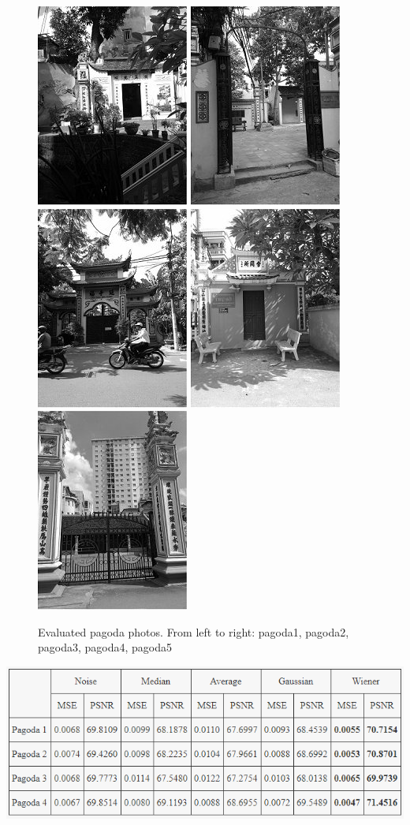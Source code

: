 \begin{figure}[h]
	\centering
	\includegraphics[width=0.18\columnwidth]{images/pagoda1.jpg}
	\includegraphics[width=0.18\columnwidth]{images/pagoda2.jpg}
	\includegraphics[width=0.18\columnwidth]{images/pagoda3.jpg}
	\includegraphics[width=0.18\columnwidth]{images/pagoda4.jpg}
	\includegraphics[width=0.18\columnwidth]{images/pagoda5.jpg}
	\caption{Evaluated pagoda photos. From left to right: pagoda1, pagoda2, pagoda3, pagoda4, pagoda5}
	\label{fig:pagoda}
\end{figure}


\begin{center}
\includegraphics[width=15cm]{images/Pagoda.png}
\end{center}


